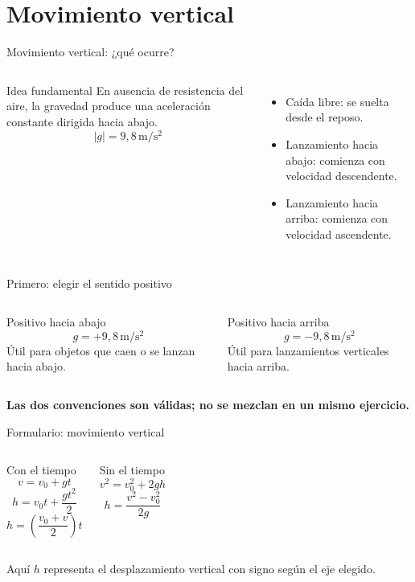 \documentclass[aspectratio=169,10pt]{beamer}
\begin{document}
\section{Movimiento vertical}
\begin{frame}{Movimiento vertical: ¿qué ocurre?}
\begin{columns}[c]
\begin{block}{Idea fundamental}
En ausencia de resistencia del aire, la gravedad produce una aceleración constante dirigida hacia abajo.
\[|g|=9,8\,\mathrm{m/s^2}\]
\end{block}
\begin{itemize}\item Caída libre: se suelta desde el reposo.\item Lanzamiento hacia abajo: comienza con velocidad descendente.\item Lanzamiento hacia arriba: comienza con velocidad ascendente.\end{itemize}
\centering{}
\end{columns}
\end{frame}
\begin{frame}{Primero: elegir el sentido positivo}
\begin{columns}[T]
\begin{block}{Positivo hacia abajo}
\[g=+9,8\,\mathrm{m/s^2}\]
Útil para objetos que caen o se lanzan hacia abajo.
\end{block}
\begin{block}{Positivo hacia arriba}
\[g=-9,8\,\mathrm{m/s^2}\]
Útil para lanzamientos verticales hacia arriba.
\end{block}
\end{columns}
\vspace{8mm}
\begin{center}\color{morado}\bfseries Las dos convenciones son válidas; no se mezclan en un mismo ejercicio.\end{center}
\end{frame}
\begin{frame}{Formulario: movimiento vertical}
\begin{columns}[T]
\begin{block}{Con el tiempo}
\[v=v_0+gt\]
\[h=v_0t+\frac{gt^2}{2}\]
\[h=\left(\frac{v_0+v}{2}\right)t\]
\end{block}
\begin{block}{Sin el tiempo}
\[v^2=v_0^2+2gh\]
\[h=\frac{v^2-v_0^2}{2g}\]
\end{block}
\end{columns}
\vspace{4mm}
\centering\small Aquí $h$ representa el desplazamiento vertical con signo según el eje elegido.
\end{frame}
\end{document}
